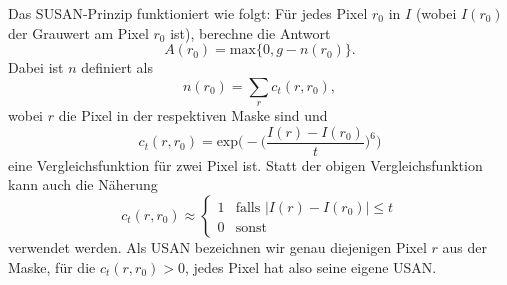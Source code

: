 \documentclass[a4paper, 11pt]{report}
\theoremstyle{definition}
\begin{document}
			Das SUSAN-Prinzip funktioniert wie folgt:
			Für jedes Pixel $r_0$ in $I$ (wobei $I(r_0)$ der Grauwert am Pixel $r_0$ ist), berechne die Antwort
				$$A(r_0) = \text{max}\{0, g - n(r_0)\}.$$
			Dabei ist $n$ definiert als
				$$n(r_0) = \sum_r c_t(r, r_0),$$
			wobei $r$ die Pixel in der respektiven Maske sind und	
				$$
					c_t(r, r_0) =
						\text{exp}\bigg(-\Big(\frac{I(r) - I(r_0)}{t}\Big)^6\bigg)
				$$
			eine Vergleichsfunktion für zwei Pixel ist. Statt der obigen Vergleichsfunktion kann auch die Näherung
				$$
					c_t(r, r_0) \approx
						\begin{cases}
							1 	& \text{falls } |I(r) - I(r_0)| \leq t 	\\
							0 	& \text{sonst}
						\end{cases}
				$$
			verwendet werden. Als USAN bezeichnen wir genau diejenigen Pixel $r$ aus der Maske, für die $c_t(r, r_0) > 0$, jedes Pixel hat also seine eigene USAN.
\end{document}

